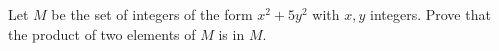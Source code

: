 Let $M$ be the set of integers of the form $x^2+5y^2$ with $x,y$ integers. Prove that the product of two elements of $M$ is in $M$.
